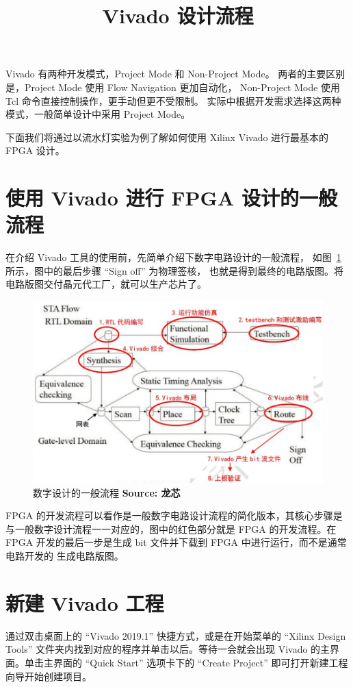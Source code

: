 \documentclass[ichigo,normal,cn]{elegantnote_mod}
\title{Vivado 设计流程}
\begin{document}
\maketitle

Vivado 有两种开发模式，Project Mode 和 Non-Project Mode。
两者的主要区别是，Project Mode 使用 Flow Navigation 更加自动化，
Non-Project Mode 使用 Tcl 命令直接控制操作，更手动但更不受限制。
实际中根据开发需求选择这两种模式，一般简单设计中采用 Project Mode。

下面我们将通过以流水灯实验为例了解如何使用 Xilinx Vivado
进行最基本的 FPGA 设计。

\section{使用 Vivado 进行 FPGA 设计的一般流程}

在介绍 Vivado 工具的使用前，先简单介绍下数字电路设计的一般流程，
如图~\ref{fig:STAFlow}~ 所示，图中的最后步骤 ``Sign off'' 为物理签核，
也就是得到最终的电路版图。将电路版图交付晶元代工厂，就可以生产芯片了。 

\begin{figure}[!htbp]
    \centering
    \includegraphics[width=.8\textwidth]{fig/STAFlow}
    \caption{数字设计的一般流程 \textbf{Source: 龙芯}}
    \label{fig:STAFlow}
\end{figure}

FPGA 的开发流程可以看作是一般数字电路设计流程的简化版本，其核心步骤是
与一般数字设计流程一一对应的，图中的红色部分就是 FPGA 的开发流程。在 FPGA
开发的最后一步是生成 bit 文件并下载到 FPGA 中进行运行，而不是通常电路开发的
生成电路版图。

\section{新建 Vivado 工程}

通过双击桌面上的 “Vivado 2019.1” 快捷方式，或是在开始菜单的 “Xilinx Design Tools”
文件夹内找到对应的程序并单击以后。等待一会就会出现 Vivado 的主界面。单击主界面的 “Quick Start”
选项卡下的 “Create Project” 即可打开新建工程向导开始创建项目。
\end{document}

